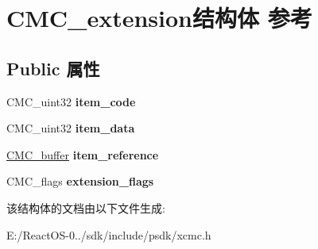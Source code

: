 \hypertarget{struct_c_m_c__extension}{}\section{C\+M\+C\+\_\+extension结构体 参考}
\label{struct_c_m_c__extension}
\subsection*{Public 属性}
\begin{DoxyCompactItemize}
\item 
\mbox{\label{struct_c_m_c__extension_a3a9ffbda03a42dae7c73e6f2ddd0192c}} 
C\+M\+C\+\_\+uint32 {\bfseries item\+\_\+code}
\item 
\mbox{\label{struct_c_m_c__extension_afdf320223fb25cf04f36b264397276e6}} 
C\+M\+C\+\_\+uint32 {\bfseries item\+\_\+data}
\item 
\mbox{\label{struct_c_m_c__extension_a33b41d31f9c9c94d1d1f915a0d89b3d5}} 
\hyperlink{interfacevoid}{C\+M\+C\+\_\+buffer} {\bfseries item\+\_\+reference}
\item 
\mbox{\label{struct_c_m_c__extension_a620554610435ee7e81122cd05feaae4e}} 
C\+M\+C\+\_\+flags {\bfseries extension\+\_\+flags}
\end{DoxyCompactItemize}


该结构体的文档由以下文件生成\+:\begin{DoxyCompactItemize}
\item 
E\+:/\+React\+O\+S-\/0../sdk/include/psdk/xcmc.\+h\end{DoxyCompactItemize}
